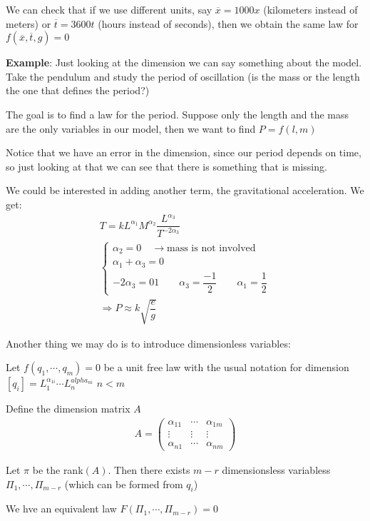\noindent We can check that if we use different units, say $\overline{x} = 1000x$ (kilometers instead of meters) or $\overline{t} = 3600t$ (hours instead of seconds), then we obtain the same law for $f(\overline{x}, \overline{t}, g) = 0$
\par\bigskip
\noindent\textbf{Example}: Just looking at the dimension we can say something about the model. Take the pendulum and study the period of oscillation (is the mass or the length the one that defines the period?)
\par\bigskip
\noindent The goal is to find a law for the period. Suppose only the length and the mass are the only variables in our model, then we want to find $P = f(l,m)$\par
\noindent Notice that we have an error in the dimension, since our period depends on time, so just looking at that we can see that there is something that is missing.
\par\bigskip
\noindent We could be interested in adding another term, the gravitational acceleration. We get:
\begin{equation*}
  \begin{gathered}
    T = kL^{\alpha_1}M^{\alpha_2}\dfrac{L^{\alpha_3}}{T^{-2\alpha_3}}\\
    \begin{cases*}
      \alpha_2 = 0\quad\rightarrow \text{mass is not involved}\\
    \alpha_1+\alpha_3 = 0\\
    -2\alpha_3 = 01\qquad \alpha_3 = \dfrac{-1}{2}\qquad \alpha_1 = \dfrac{1}{2}
    \end{cases*}\\
    \Rightarrow P\approx k\sqrt{\dfrac{e}{g}}
  \end{gathered}
\end{equation*}
\par\bigskip
\noindent Another thing we may do is to introduce dimensionless variables:
\par\bigskip
\begin{theo}[Pi:s theorem]{}
  Let $f(q_1,\cdots,q_m) = 0$ be a unit free law with the usual notation for dimension $[q_i] = L_1^{\alpha_{1i}}\cdots L_n^{alpha_{ni}}$ $n<m$
  \par\bigskip
  \noindent Define the dimension matrix $A$
  \begin{equation*}
    \begin{gathered}
      A = \begin{pmatrix}\alpha_{11}&\cdots&\alpha_{1m}\\
      \vdots&\vdots&\vdots\\
    \alpha_{n1}&\cdots&\alpha_{nm}\end{pmatrix}
    \end{gathered}
  \end{equation*}
  \par\bigskip
  \noindent Let $\pi$ be the rank$(A)$. Then there exists $m-r$ dimensionsless variabless $\Pi_1,\cdots,\Pi_{m-r}$ (which can be formed from $q_i$)
  \par\bigskip
  \noindent We hve an equivalent law $F(\Pi_1,\cdots,\Pi_{m-r}) = 0$
\end{theo}
